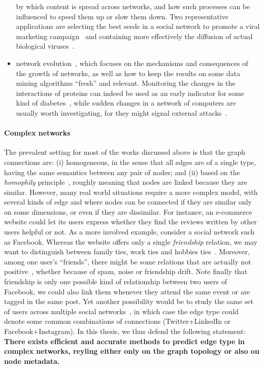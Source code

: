 \begin{itemize}[nosep,leftmargin=*]
    by which content is spread across networks, and how such processes can be influenced to speed
    them up or slow them down. Two representative applications are selecting the best seeds in a social
    network to promote a viral marketing campaign~\autocite{infmaxKempe15} and containing more effectively the
    diffusion of actual biological viruses~\autocite{influenceBio13}.
  \item network evolution~\autocite{networkEvolution14}, which focuses on the mechanisms and
    consequences of the growth of networks, as well as how to keep the results on some data
    mining algorithms \enquote{fresh} and relevant. Monitoring the changes in the interactions of
    proteins can indeed be used as an early indicator for some kind of
    diabetes~\autocite{evolBio10}, while sudden changes in a network of computers are usually worth
    investigating, for they might signal external attacks~\autocite{evolSecurity04}.
\end{itemize}

\vspace{-\baselineskip}
\paragraph{Complex networks}

The prevalent setting for most of the works discussed above is that the graph connections are: (i)
homogeneous, in the sense that all edges are of a single type, having the same semantics  between
any pair of nodes; and (ii) based on the \emph{homophily} principle~\autocite{Homophily01}, roughly
meaning that nodes are linked because they are similar. However, many real world situations require
a more complex model, with several kinds of edge and where nodes can be connected if they are
similar only on some dimensions, or even if they are dissimilar. For instance, an e-commerce website
could let its users express whether they find the reviews written by other users helpful or not. As a
more involved example, consider a social network such as Facebook. Whereas the website offers only a
single \emph{friendship} relation, we may want to distinguish between family ties, work ties and
hobbies ties~\autocite{LeskovecEgo12}. Moreover, among one user's \enquote{friends}, there might be some
relations that are actually not positive~\autocite{Yang2012}, whether because of spam, noise or
friendship drift. Note finally that friendship is only one possible kind of relationship between two
users of Facebook, we could also link them whenever they attend the same event or are tagged in the
same post. Yet another possibility would be to study the same set of users across multiple social
networks~\autocite{mergingNetworks16}, in which case the edge type could denote some common
combinations of connections (\eg Twitter+LinkedIn or Facebook+Instagram). In this thesis, we thus
defend the following statement: \textbf{There exists efficient and accurate methods to predict edge
type in complex networks, reyling either only on the graph topology or also on node metadata.}

